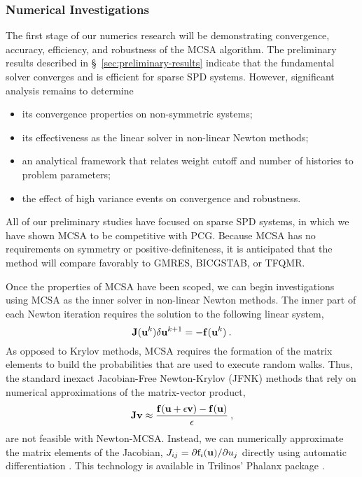 \subsubsection{Numerical Investigations}

The first stage of our numerics research will be demonstrating convergence,
accuracy, efficiency, and robustness of the MCSA algorithm.  The preliminary
results described in \S~\ref{sec:preliminary-results} indicate that the
fundamental solver converges and is efficient for sparse SPD systems.
However, significant analysis remains to determine
\begin{itemize}
\parskip = -2pt
\item its convergence properties on non-symmetric systems;
\item its effectiveness as the linear solver in non-linear Newton methods;
\item an analytical framework that relates weight cutoff and number of
  histories to problem parameters;
\item the effect of high variance events on convergence and robustness.
\end{itemize}
All of our preliminary studies have focused on sparse SPD systems, in which we
have shown MCSA to be competitive with PCG.  Because MCSA has no requirements
on symmetry or positive-definiteness, it is anticipated that the method will
compare favorably to GMRES, BICGSTAB, or TFQMR.

Once the properties of MCSA have been scoped, we can begin investigations
using MCSA as the inner solver in non-linear Newton methods.  The inner part
of each Newton iteration requires the solution to the following linear system,
\begin{equation}
  \mathbf{J}(\mathbf{u}^k)\delta\mathbf{u}^{k+1} = -\mathbf{f}(\mathbf{u}^k)\:.
\end{equation}
As opposed to Krylov methods, MCSA requires the formation of the matrix
elements to build the probabilities that are used to execute random walks.
Thus, the standard inexact Jacobian-Free Newton-Krylov (JFNK)\cite{knoll_2004}
methods that rely on numerical approximations of the matrix-vector product,
\begin{equation}
  \mathbf{J}\mathbf{v} \approx \frac{\mathbf{f}(\mathbf{u}+\epsilon\mathbf{v}) - 
    \mathbf{f}(\mathbf{u})}{\epsilon}\:,
\end{equation}
are not feasible with Newton-MCSA.  Instead, we can numerically approximate
the matrix elements of the Jacobian, $J_{ij} = \partial \mathrm{f}_i(\mathbf{u})/\partial
u_j$ directly using automatic differentiation
\cite{Bartlett_2006,Notz:2010wk}.  This technology is available in Trilinos'
Phalanx package \cite{Pawlowski:2008vy}.

